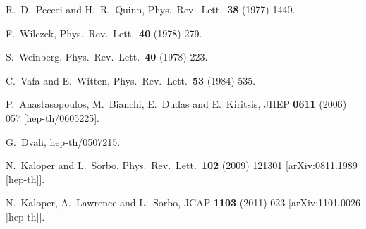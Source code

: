 \begin{thebibliography}{10}
  R.~D.~Peccei and H.~R.~Quinn,
  Phys.\ Rev.\ Lett.\  {\bf 38} (1977) 1440.


  F.~Wilczek,
  Phys.\ Rev.\ Lett.\  {\bf 40} (1978) 279.


  S.~Weinberg,
  Phys.\ Rev.\ Lett.\  {\bf 40} (1978) 223.


  C.~Vafa and E.~Witten,
  Phys.\ Rev.\ Lett.\  {\bf 53} (1984) 535.


  P.~Anastasopoulos, M.~Bianchi, E.~Dudas and E.~Kiritsis,
  JHEP {\bf 0611} (2006) 057
  [hep-th/0605225].

  G.~Dvali,
  hep-th/0507215.

  N.~Kaloper and L.~Sorbo,
  Phys.\ Rev.\ Lett.\  {\bf 102} (2009) 121301
  [arXiv:0811.1989 [hep-th]].


  N.~Kaloper, A.~Lawrence and L.~Sorbo,
  JCAP {\bf 1103} (2011) 023
  [arXiv:1101.0026 [hep-th]].



\end{thebibliography}
